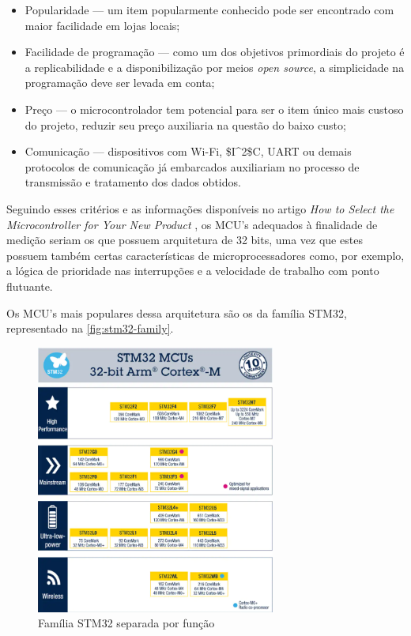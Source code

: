\begin{itemize}
    \item Popularidade --- um item popularmente conhecido pode ser encontrado com maior facilidade em lojas locais;
    \item Facilidade de programação --- como um dos objetivos primordiais do projeto é a replicabilidade e a disponibilização por meios \textit{open source}, a simplicidade na programação deve ser levada em conta;
    \item Preço --- o microcontrolador tem potencial para ser o item único mais custoso do projeto, reduzir seu preço auxiliaria na questão do baixo custo;
    \item Comunicação --- dispositivos com Wi-Fi, \gls{$I^2$C}, UART ou demais protocolos de comunicação já embarcados auxiliariam no processo de transmissão e tratamento dos dados obtidos.
\end{itemize}

Seguindo esses critérios e as informações disponíveis no artigo \textit{How to Select the Microcontroller for Your New Product} \cite{select_uC}, os \gls{MCU}'s adequados à finalidade de medição seriam os que possuem arquitetura de 32 bits, uma vez que estes possuem também certas características de microprocessadores como, por exemplo, a lógica de prioridade nas interrupções e a velocidade de trabalho com ponto flutuante.

Os \gls{MCU}'s mais populares dessa arquitetura são os da família STM32, representado na \autoref{fig:stm32-family}.

\begin{figure}[htb!]
    \caption{Família STM32 separada por função}
    \label{fig:stm32-family}
    \includegraphics[width=0.7\textwidth]{figuras/STM32-family.png}
\end{figure}

